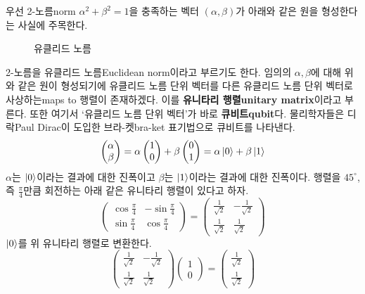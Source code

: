 \documentclass[a4paper,chapter,atbegshi]{oblivoir}
\begin{document}
우선 2-노름{\tiny norm} $\alpha^2+\beta^2=1$을 충족하는 벡터 $(\alpha,\beta)$가
아래와 같은 원을 형성한다는 사실에 주목한다. 
\begin{figure}[h]
\begin{center}
  \caption{유클리드 노름\label{fig:1-1}}
\end{center}
\end{figure}
2-노름을 유클리드 노름{\tiny Euclidean norm}이라고 부르기도 한다.
임의의 $\alpha,\beta$에 대해 위와 같은 원이 형성되기에 유클리드 노름 단위
벡터를 다른 유클리드 노름 단위 벡터로 사상하는{\tiny maps to} 행렬이
존재하겠다. 이를 \textbf{유니타리 행렬\tiny unitary matrix}이라고 부른다.
또한 여기서 `유클리드 노름 단위 벡터'가 바로 \textbf{큐비트\tiny qubit}다. 
물리학자들은 디락{\tiny Paul Dirac}이 도입한 브라-켓{\tiny bra-ket} 표기법으로
큐비트를 나타낸다.
\[
  \begin{pmatrix}\alpha\\\beta\end{pmatrix} =
  \alpha\begin{pmatrix}1\\0\end{pmatrix}+
  \beta\begin{pmatrix}0\\1\end{pmatrix} = \alpha\ket{0}+\beta\ket{1}
\]
$\alpha$는 $\ket{0}$이라는 결과에 대한 진폭이고 $\beta$는 $\ket{1}$이라는
결과에 대한 진폭이다. 행렬을 $45^{\circ}$, 즉 $\frac{\pi}{4}$만큼
회전하는 아래 같은 유니타리 행렬이 있다고 하자.
\[
  \begin{pmatrix}
    \cos\frac{\pi}{4} &-\sin\frac{\pi}{4}\\
    \sin\frac{\pi}{4} &\cos\frac{\pi}{4}
  \end{pmatrix}
  = \begin{pmatrix}
    \frac{1}{\sqrt{2}} &-\frac{1}{\sqrt{2}} \\
    \frac{1}{\sqrt{2}} &\frac{1}{\sqrt2}
  \end{pmatrix}
\]
$\ket0$를 위 유니타리 행렬로 변환한다.
\begin{equation}\label{eq:1-2}
  \begin{pmatrix}
    \frac{1}{\sqrt{2}} &-\frac{1}{\sqrt{2}} \\
    \frac{1}{\sqrt{2}} &\frac{1}{\sqrt2}
  \end{pmatrix}
  \begin{pmatrix}
    1\\0
  \end{pmatrix}
  =\begin{pmatrix}
    \frac{1}{\sqrt2}\\\frac{1}{\sqrt2}
  \end{pmatrix}
\end{equation}
\end{document}
